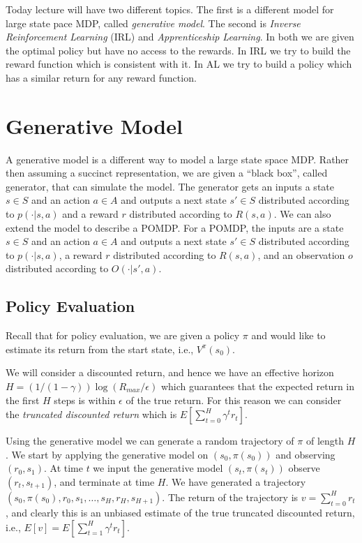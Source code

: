
Today lecture will have two different topics. The first is a
different model for large state pace MDP, called {\em generative
model}. The second is {\em Inverse Reinforcement Learning} (IRL) and
{\em Apprenticeship Learning}. In both we are given the optimal
policy but have no access to the rewards. In IRL we try to build the
reward function which is consistent with it. In AL we try to build a
policy which has a similar return for any reward function.

\section{Generative Model}

A generative model is a different way to model a large state space
MDP. Rather then assuming a succinct representation, we are given a
``black box'', called generator, that can simulate the model. The
generator gets an inputs a state $s\in S$ and an action $a\in A$ and
outputs a next state $s'\in S$ distributed according to $p(\cdot
|s,a)$ and a reward $r$ distributed according to $R(s,a)$. We can
also extend the model to describe a POMDP. For a POMDP, the inputs
are a state $s\in S$ and an action $a\in A$ and outputs a next state
$s'\in S$ distributed according to $p(\cdot |s,a)$, a reward $r$
distributed according to $R(s,a)$, and an observation $o$
distributed according to $O(\cdot|s',a)$.

\subsection{Policy Evaluation}

Recall that for policy evaluation, we are given a policy $\pi$ and
would like to estimate its return from the start state, i.e.,
$V^\pi(s_0)$.

We will consider a discounted return, and hence we have an effective
horizon $H=(1/(1-\gamma))\log (R_{max}/\epsilon)$ which guarantees
that the expected return in the first $H$ steps is within $\epsilon$
of the true return. For this reason we can consider the {\em
truncated discounted return} which is $E[\sum_{t=0}^H \gamma^t
r_t]$.

Using the generative model we can generate a random trajectory of
$\pi$ of length $H$. We start by applying the generative model on
$(s_0, \pi(s_0))$ and observing $(r_0,s_1)$. At time $t$ we input
the generative model $(s_t,\pi(s_t))$  observe $(r_t,s_{t+1})$, and
terminate at time $H$. We have generated a trajectory
$(s_0,\pi(s_0), r_0, s_1, \ldots, s_H,r_H,s_{H+1})$. The return of
the trajectory is $v=\sum_{t=0}^H r_t$, and clearly this is an
unbiased estimate of the true truncated discounted return, i.e.,
$E[v]=E[\sum_{t=1}^H \gamma^t r_t]$.


